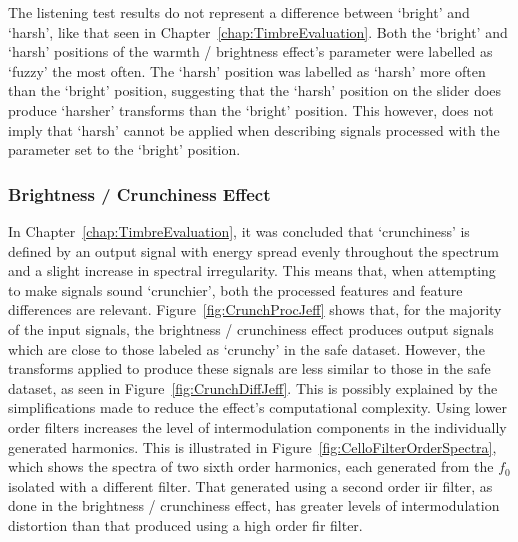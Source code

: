 			The listening test results do not represent a difference between `bright' and `harsh', like that
			seen in Chapter~\ref{chap:TimbreEvaluation}. Both the `bright' and `harsh' positions of the warmth
			/ brightness effect's parameter were labelled as `fuzzy' the most often. The `harsh' position was
			labelled as `harsh' more often than the `bright' position, suggesting that the `harsh' position on
			the slider does produce `harsher' transforms than the `bright' position. This however, does not
			imply that `harsh' cannot be applied when describing signals processed with the parameter set to
			the `bright' position.
			
		\subsubsection*{Brightness / Crunchiness Effect}
			In Chapter~\ref{chap:TimbreEvaluation}, it was concluded that `crunchiness' is defined by an output
			signal with energy spread evenly throughout the spectrum and a slight increase in spectral
			irregularity. This means that, when attempting to make signals sound `crunchier', both the
			processed features and feature differences are relevant.  Figure~\ref{fig:CrunchProcJeff} shows
			that, for the majority of the input signals, the brightness / crunchiness effect produces output
			signals which are close to those labeled as `crunchy' in the \acrshort{safe} dataset. However, the
			transforms applied to produce these signals are less similar to those in the \acrshort{safe}
			dataset, as seen in Figure~\ref{fig:CrunchDiffJeff}. This is possibly explained by the
			simplifications made to reduce the effect's computational complexity. Using lower order filters
			increases the level of intermodulation components in the individually generated harmonics. This is
			illustrated in Figure~\ref{fig:CelloFilterOrderSpectra}, which shows the spectra of two sixth order
			harmonics, each generated from the $f_{0}$ isolated with a different filter. That generated using a
			second order \acrshort{iir} filter, as done in the brightness / crunchiness effect, has greater
			levels of intermodulation distortion than that produced using a high order \acrshort{fir} filter. 
			

